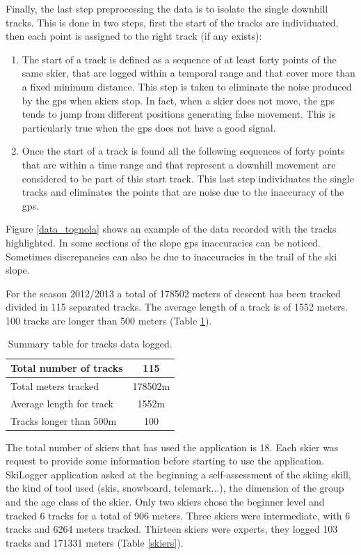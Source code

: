 \documentclass[12pt,a4paper,twoside]{book}
\begin{document}
Finally, the last step preprocessing the data is to isolate the single downhill tracks. This is done in two steps, first the start of the tracks are individuated, then each point is assigned to the right track (if any exists):
\begin{enumerate}
\item The start of a track is defined as a sequence of at least forty points of the same skier, that are logged within a temporal range and that cover more than a fixed minimum distance. This step is taken to eliminate the noise produced by the gps when skiers stop. In fact, when a skier does not move, the gps tends to jump from different positions generating false movement. This is particularly true when the gps does not have a good signal.
\item Once the start of a track is found all the following sequences of forty points that are within a time range and that represent a downhill movement are considered to be part of this start track. This last step individuates the single tracks and eliminates the points that are noise due to the inaccuracy of the gps.
\end{enumerate}

Figure \ref{data_tognola} shows an example of the data recorded with the tracks highlighted. In some sections of the slope gps inaccuracies can be noticed. Sometimes discrepancies can also be due to inaccuracies in the trail of the ski slope.

For the season 2012/2013 a total of 178502 meters of descent has been tracked divided in 115 separated tracks. The average length of a track is of 1552 meters. 100 tracks are longer than 500 meters (Table \ref{descendts}).

\begin{table}[!h]
  \centering
  \begin{tabular}{ | l | c | }
    \hline
    Total number of tracks & 115 \\ \hline
    Total meters tracked & 178502m \\ \hline
    Average length for track & 1552m \\ \hline
    Tracks longer than 500m & 100 \\
    \hline
  \end{tabular}
  \caption{Summary table for tracks data logged.}
  \label{descendts}
\end{table}

The total number of skiers that has used the application is 18. Each skier was request to provide some information before starting to use the application. SkiLogger application asked at the beginning a self-assessment of the skiing skill, the kind of tool used (skis, snowboard, telemark...), the dimension of the group and the age class of the skier. Only two skiers chose the beginner level and tracked 6 tracks for a total of 906 meters. Three skiers were intermediate, with 6 tracks and 6264 meters tracked. Thirteen skiers were experts, they logged 103 tracks and 171331 meters (Table \ref{skiers}).
\end{document}
